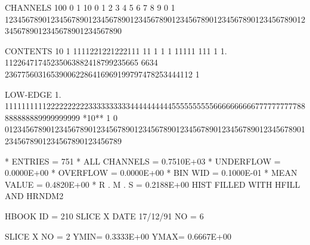 \begin{Listing}
 CHANNELS 100   0                                                                                                  1   
           10   0        1         2         3         4         5         6         7         8         9         0   
            1   1234567890123456789012345678901234567890123456789012345678901234567890123456789012345678901234567890   
 
 CONTENTS  10                      1 1111221221222111 11                 1 1  1 11111  111   1                      
            1.              11226471745235063882418799235665 6634 236775603165390062286416969199797478253444112 1   
 
 LOW-EDGE   1.            111111111122222222223333333333444444444455555555556666666666777777777788888888889999999999
 *10**  1   0   0123456789012345678901234567890123456789012345678901234567890123456789012345678901234567890123456789
 
 * ENTRIES =        751      * ALL CHANNELS = 0.7510E+03      * UNDERFLOW = 0.0000E+00      * OVERFLOW = 0.0000E+00
 * BIN WID = 0.1000E-01      * MEAN VALUE   = 0.4820E+00      * R . M . S = 0.2188E+00
\newpage
 HIST FILLED WITH HFILL AND HRNDM2                                               
 
 HBOOK     ID =       210             SLICE X                    DATE  17/12/91              NO =   6
 
 SLICE X     NO =   2     YMIN=  0.3333E+00  YMAX=  0.6667E+00
 

\end{Listing}
